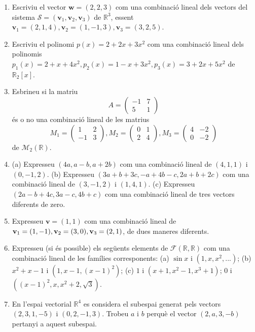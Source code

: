 \begin{enumerate}
\item Escriviu el vector $\mathbf{w}=(2,2,3)$ com una combinació
lineal dels vectors del sistema $\mathcal{S}=(\mathbf{v}_{1},\mathbf{v}%
_{2},\mathbf{v}_{3})$ de $\mathbb{R}^{3}$, essent $\mathbf{v}_{1}=(2,1,4),%
\mathbf{v}_{2}=(1,-1,3),\mathbf{v}_{3}=(3,2,5)$.

\item Escriviu el polinomi $p(x)=2+2x+3x^{2}$ com una combinació
lineal dels polinomis $%
p_{1}(x)=2+x+4x^{2},p_{2}(x)=1-x+3x^{2},p_{3}(x)=3+2x+5x^{2}$ de $\mathbb{R}%
_{2}\left[ x\right] $.

\item Esbrineu si la matriu%
\[
A=\left( 
\begin{array}{cc}
-1 & 7 \\ 
5 & 1%
\end{array}%
\right) 
\]%
és o no una combinació lineal de les matrius%
\[
M_{1}=\left( 
\begin{array}{cc}
1 & 2 \\ 
-1 & 3%
\end{array}%
\right) ,M_{2}=\left( 
\begin{array}{cc}
0 & 1 \\ 
2 & 4%
\end{array}%
\right) ,M_{3}=\left( 
\begin{array}{cc}
4 & -2 \\ 
0 & -2%
\end{array}%
\right) 
\]%
de $\mathcal{M}_{2}(\mathbb{R})$.

\item (a) Expresseu $(4a,a-b,a+2b)$ com una combinació lineal de $%
(4,1,1) $ i $(0,-1,2)$. (b) Expresseu $(3a+b+3c,-a+4b-c,2a+b+2c)$ com una
combinació lineal de $(3,-1,2)$ i $(1,4,1)$. (c) Expresseu $%
(2a-b+4c,3a-c,4b+c)$ com una combinació lineal de tres vectors
diferents de zero.

\item Expresseu $\mathbf{v}=(1,1)$ com una combinació lineal de $\mathbf{%
v}_{1}=(1,-1),\mathbf{v}_{2}=(3,0),\mathbf{v}_{3}=(2,1)$, de dues maneres
diferents.

\item Expresseu (si és possible) els següents elements de $\mathcal{F}(%
\mathbb{R},\mathbb{R})$ com una combinació lineal de les famílies
corresponents: (a) $\sin x$ i $(1,x,x^{2},...)$; (b) $x^{2}+x-1$ i $%
(1,x-1,(x-1)^{2})$; (c) $1$ i $(x+1,x^{2}-1,x^{3}+1)$; $0$ i $%
((x-1)^{2},x,x^{2}+2,\sqrt{3})$.

\item En l’espai vectorial $\mathbb{R}^{4}$ es considera el subespai
generat pels vectors $(2,3,1,-5)$ i $(0,2,-1,3)$. Trobeu $a$ i $b$
perquè el vector $(2,a,3,-b)$ pertanyi a aquest subespai.


\end{enumerate}
